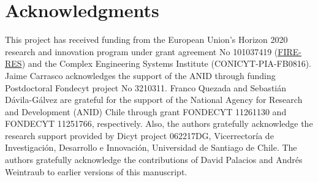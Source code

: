 \documentclass{itor}
\begin{document}
\section*{Acknowledgments}
This project has received funding from the European Union’s Horizon 2020 research and innovation program under grant agreement No 101037419 (\href{https://fire-res.eu}{FIRE-RES}) and the Complex Engineering Systems Institute (CONICYT-PIA-FB0816). Jaime Carrasco acknowledges the support of the ANID through funding Postdoctoral Fondecyt project No 3210311. Franco Quezada and Sebastián Dávila-Gálvez are grateful for the support of the National Agency for Research and Development (ANID) Chile through grant FONDECYT 11261130 and FONDECYT 11251766, respectively. Also, the authors gratefully acknowledge the research support provided by Dicyt project 062217DG, Vicerrector\'ia de Investigaci\'on, Desarrollo e Innovaci\'on, Universidad de Santiago de Chile. The authors gratefully acknowledge the contributions of David Palacios and Andr\'es Weintraub to earlier versions of this manuscript.




\end{document}
